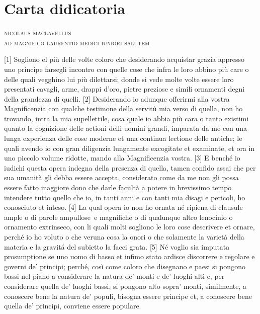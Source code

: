 
\section{Carta didicatoria}

\noindent\textsc{nicolaus maclavellus\\ ad magnifico laurentio medici iuniori salutem} %

{[}1{]} Sogliono el più delle volte coloro che desiderando acquistar
grazia appresso uno principe farsegli incontro con quelle cose che infra
le loro abbino più care o delle quali vegghino lui più dilettarsi; donde
si vede molte volte essere loro presentati cavagli, arme, drappi d'oro,
pietre preziose e simili ornamenti degni della grandezza di quelli.
{[}2{]} Desiderando io adunque offerirmi alla vostra Magnificenzia con
qualche testimone della servitù mia verso di quella, non ho trovando,
intra la mia supellettile, cosa quale io abbia più cara o tanto existimi
quanto la cognizione delle actioni delli uomini grandi, imparata da me
con una lunga experienza delle cose moderne et una continua lectione
delle antiche; le quali avendo io con gran diligenzia lungamente
excogitate et examinate, et ora in uno piccolo volume ridotte, mando
alla Magnificenzia vostra. {[}3{]} E benché io iudichi questa opera
indegna della presenza di quella, tamen confido assai che per sua
umanità gli debba essere accepta, considerato come da me non gli possa
essere fatto maggiore dono che darle facultà a potere in brevissimo
tempo intendere tutto quello che io, in tanti anni e con tanti mia
disagi e pericoli, ho conosciuto et inteso. {[}4{]} La qual opera io non
ho ornata né ripiena di clausule ample o di parole ampullose\est\ e
magnifiche o di qualunque altro lenocinio o ornamento extrinseco, con li
quali molti sogliono le loro cose descrivere et ornare, perché io ho
voluto o che veruna cosa la onori o che solamente la varietà della
materia e la gravitá del subietto la facci grata. {[}5{]} Né voglio sia
imputata prosumptione se uno uomo di basso et infimo stato ardisce
discorrere e regolare e governi de' principi; perché, così come coloro
che disegnano e paesi si pongono bassi nel piano a considerare la natura
de' monti e de' luoghi alti e, per considerare quella de' luoghi bassi,
si pongono alto sopra' monti, similmente, a conoscere bene la natura de'
populi, bisogna essere principe et, a conoscere bene quella de'
principi, conviene essere populare.

